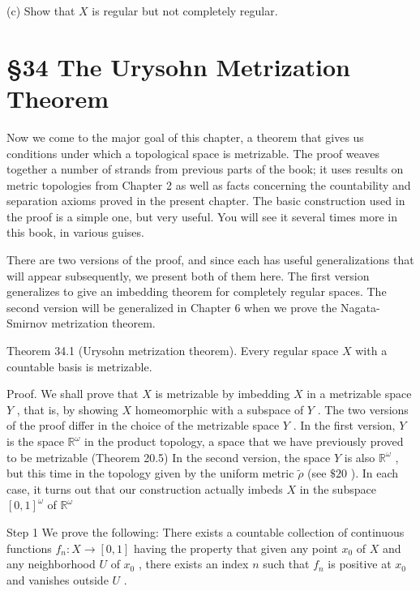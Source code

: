 (c) Show that \(X\) is regular but not completely regular.

\section*{§34 The Urysohn Metrization Theorem}

Now we come to the major goal of this chapter, a theorem that gives us conditions under which a topological space is metrizable. The proof weaves together a number of strands from previous parts of the book; it uses results on metric topologies from Chapter 2 as well as facts concerning the countability and separation axioms proved in the present chapter. The basic construction used in the proof is a simple one, but very useful. You will see it several times more in this book, in various guises.

There are two versions of the proof, and since each has useful generalizations that will appear subsequently, we present both of them here. The first version generalizes to give an imbedding theorem for completely regular spaces. The second version will be generalized in Chapter 6 when we prove the Nagata-Smirnov metrization theorem.

Theorem 34.1 (Urysohn metrization theorem). Every regular space \(X\) with a countable basis is metrizable.

Proof. We shall prove that \(X\) is metrizable by imbedding \(X\) in a metrizable space \(Y\) , that is, by showing \(X\) homeomorphic with a subspace of \(Y\) . The two versions of the proof differ in the choice of the metrizable space \(Y\) . In the first version, \(Y\) is the space \({\mathbb{R}}^{\omega }\) in the product topology, a space that we have previously proved to be metrizable (Theorem 20.5) In the second version, the space \(Y\) is also \({\mathbb{R}}^{\omega }\) , but this time in the topology given by the uniform metric \(\widetilde{\rho }\) (see \(\$ {20}\) ). In each case, it turns out that our construction actually imbeds \(X\) in the subspace \({\left\lbrack  0,1\right\rbrack  }^{\omega }\) of \({\mathbb{R}}^{\omega }\)

Step 1 We prove the following: There exists a countable collection of continuous functions \({f}_{n} : X \rightarrow  \left\lbrack  {0,1}\right\rbrack\) having the property that given any point \({x}_{0}\) of \(X\) and any neighborhood \(U\) of \({x}_{0}\) , there exists an index \(n\) such that \({f}_{n}\) is positive at \({x}_{0}\) and vanishes outside \(U\) .

